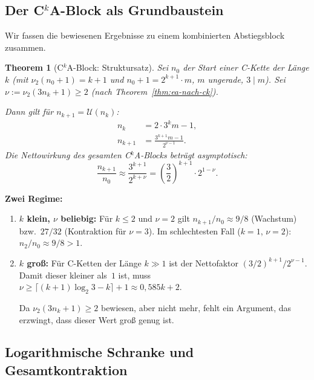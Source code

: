 \documentclass[12pt,a4paper]{article}
\newtheorem{theorem}[definition]{Theorem}
\newcommand{\vii}{\nu_2}
\newcommand{\U}{\mathcal{U}}
\begin{document}
	\subsection{Der C$^k$A-Block als Grundbaustein}
	
	Wir fassen die bewiesenen Ergebnisse zu einem kombinierten Abstiegsblock zusammen.
	
	\begin{theorem}[C$^k$A-Block: Struktursatz]
		\label{thm:cka}
		Sei $n_0$ der Start einer C-Kette der Länge $k$ (mit $\vii(n_0+1) = k+1$ und
		$n_0+1 = 2^{k+1} \cdot m$, $m$ ungerade, $3 \mid m$).
		Sei $\nu := \vii(3n_k+1) \geq 2$ (nach Theorem~\ref{thm:ea-nach-ck}).
		
		Dann gilt für $n_{k+1} = \U(n_k)$:
		\begin{align*}
			n_k &= 2 \cdot 3^k m - 1,\\
			n_{k+1} &= \frac{3^{k+1}m - 1}{2^{\nu-1}}.
		\end{align*}
		Die Nettowirkung des gesamten C$^k$A-Blocks beträgt asymptotisch:
		\[
		\frac{n_{k+1}}{n_0}
		\approx \frac{3^{k+1}}{2^{k+\nu}}
		= \left(\frac{3}{2}\right)^{k+1} \cdot 2^{1-\nu}.
		\]
	\end{theorem}
	
	\begin{tcolorbox}[kernidee]
		\textbf{Zwei Regime:}
		\begin{enumerate}[label=(\arabic*)]
			\item \textbf{$k$ klein, $\nu$ beliebig:} Für $k \leq 2$ und $\nu = 2$
			gilt $n_{k+1}/n_0 \approx 9/8$ (Wachstum) bzw.\ $27/32$ (Kontraktion für $\nu=3$).
			Im schlechtesten Fall ($k=1$, $\nu=2$): $n_2/n_0 \approx 9/8 > 1$.
			
			\item \textbf{$k$ groß:} Für C-Ketten der Länge $k \gg 1$ ist der Nettofaktor
			$(3/2)^{k+1}/2^{\nu-1}$. Damit dieser kleiner als~$1$ ist, muss
			$\nu \geq \lceil (k+1)\log_2 3 - k \rceil + 1 \approx 0{,}585k + 2$.
			
			Da $\vii(3n_k+1) \geq 2$ bewiesen, aber nicht mehr, fehlt ein Argument,
			das erzwingt, dass dieser Wert groß genug ist.
		\end{enumerate}
	\end{tcolorbox}
	
	\subsection{Logarithmische Schranke und Gesamtkontraktion}
	
\end{document}
